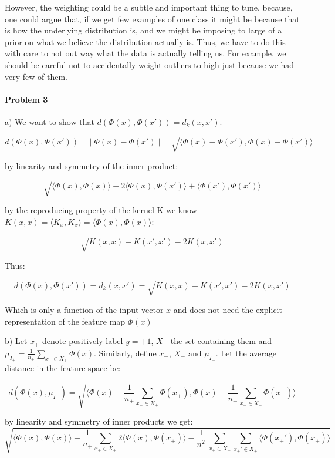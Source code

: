 \documentclass[12pt]{report}
\begin{document}
However, the weighting could be a subtle and important thing to tune, because, one could argue that, if we get few examples of one class it might be because that is how the underlying distribution is, and we might be imposing to large of a prior on what we believe the distribution actually is. Thus, we have to do this with care to not out way what the data is actually telling us. For example, we should be careful not to accidentally weight outliers to high just because we had very few of them. 

\paragraph{Problem 3}

a) We want to show that $d(\Phi(x), \Phi(x')) = d_{k}(x, x') $.

$$d(\Phi(x), \Phi(x')) = || \Phi(x) - \Phi(x')|| = \sqrt{ \langle \Phi(x) - \Phi(x'), \Phi(x) - \Phi(x') \rangle}$$

by linearity and symmetry of the inner product:

$$\sqrt{ \langle \Phi(x), \Phi(x) \rangle -  2\langle \Phi(x), \Phi(x') \rangle + \langle \Phi(x'), \Phi(x') \rangle}$$

by the reproducing property of the kernel K we know $K(x,x) = \langle K_x, K_x \rangle =\langle \Phi(x), \Phi(x) \rangle$:

$$\sqrt{ K(x,x) + K(x',x') - 2K(x,x')  }$$

Thus:

$$d(\Phi(x), \Phi(x')) =  d_{k}(x, x') = \sqrt{ K(x,x) + K(x',x') - 2K(x,x')  }$$

Which is only a function of the input vector $x$ and does not need the explicit representation of the feature map $\Phi(x)$

b) Let $x_+$ denote positively label $y = +1$, $X_+$ the set containing them and $ \mu_{I_+} =  \frac{1}{n_+}\sum_{x_+ \in X_+} \Phi(x) $. Similarly, define $x_-$, $X_-$ and $ \mu_{I_-}$. Let the average distance in the feature space be:

$$d(\Phi(x),  \mu_{I_+}) = \sqrt{ \langle \Phi(x) -  \frac{1}{n_+}\sum_{x_+ \in X_+}\Phi(x_+),   \Phi(x) - \frac{1}{n_+}\sum_{x_+  \in X_+}\Phi(x_+) \rangle }$$

by linearity and symmetry of inner products we get:
 $$\sqrt{ \langle \Phi(x), \Phi(x) \rangle - \frac{1}{n_+} \sum_{x_+ \in X_+} 2\langle \Phi(x), \Phi(x_+) \rangle - \frac{1}{n_+^2}\sum_{x_+ \in X_+} \sum_{x_+' \in X_+}  \langle  \Phi(x_+') , \Phi(x_+) \rangle       }$$
 
\end{document}
